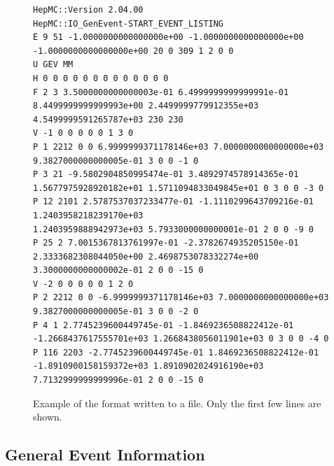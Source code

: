 \documentclass[11pt,letterpaper]{article}
\begin{document}
\begin{figure}[h]
  \begin{center}
{\tiny \begin{verbatim}
HepMC::Version 2.04.00 
HepMC::IO_GenEvent-START_EVENT_LISTING 
E 9 51 -1.0000000000000000e+00 -1.0000000000000000e+00 -1.0000000000000000e+00 20 0 309 1 2 0 0
U GEV MM 
H 0 0 0 0 0 0 0 0 0 0 0 0 0 
F 2 3 3.5000000000000003e-01 6.4999999999999991e-01 8.4499999999999993e+00 2.4499999779912355e+03 4.5499999591265787e+03 230 230
V -1 0 0 0 0 0 1 3 0 
P 1 2212 0 0 6.9999999371178146e+03 7.0000000000000000e+03 9.3827000000000005e-01 3 0 0 -1 0
P 3 21 -9.5802904850995474e-01 3.4892974578914365e-01 1.5677975928920182e+01 1.5711094833049845e+01 0 3 0 0 -3 0
P 12 2101 2.5787537037233477e-01 -1.1110299643709216e-01 1.2403958218239170e+03
1.2403959888942973e+03 5.7933000000000001e-01 2 0 0 -9 0
P 25 2 7.0015367813761997e-01 -2.3782674935205150e-01 2.3333682308044050e+00 2.4698753078332274e+00 3.3000000000000002e-01 2 0 0 -15 0
V -2 0 0 0 0 0 1 2 0 
P 2 2212 0 0 -6.9999999371178146e+03 7.0000000000000000e+03 9.3827000000000005e-01 3 0 0 -2 0
P 4 1 2.7745239600449745e-01 -1.8469236508822412e-01 -1.2668437617555701e+03 1.2668438056011901e+03 0 3 0 0 -4 0
P 116 2203 -2.7745239600449745e-01 1.8469236508822412e-01 -1.8910900158159372e+03 1.8910902024916190e+03 7.7132999999999996e-01 2 0 0 -15 0
\end{verbatim}}
  \end{center}
  \caption[Example of ascii format]
          {\label{ascii_format} Example of the format written to a file.  
           Only the first few lines are shown. }
\end{figure}

%
%

\subsection{General Event Information}
\end{document}

